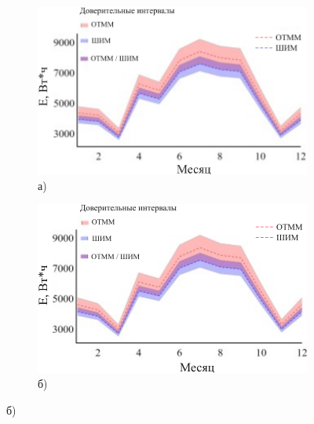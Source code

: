 \begin{figure}[H]
    \centering
    \begin{subfigure}[b]{0.45\textwidth}
        \centering
        \includegraphics[width=\textwidth]{media/ict/image1}
        \caption*{а)}
    \end{subfigure}
    \hfill
    \begin{subfigure}[b]{0.45\textwidth}
        \centering
        \includegraphics[width=\textwidth]{media/ict/image2}
        \caption*{б)}
    \end{subfigure}

    \par\bigskip


\end{figure}
